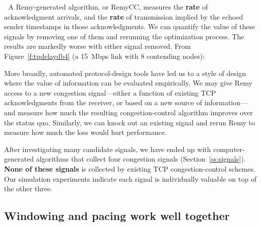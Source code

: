 \vspace{\baselineskip}
\enlargethispage{\baselineskip}

\noindent \begin{minipage}{\textwidth}

\textcolor{white}{.}\hspace{\parindent} A Remy-generated algorithm, or
RemyCC, measures the \textbf{rate} of acknowledgment arrivals, and the
\textbf{rate} of transmission implied by the echoed sender timestamps
in those acknowledgments. We can quantify the value of these signals
by removing one of them and rerunning the optimization process. The
results are markedly worse with either signal removed.  From
Figure~\ref{f:tpdelaydb4} (a 15~Mbps link with 8 contending nodes):

\begin{center}
\def\svgwidth{0.8 \textwidth}\footnotesize
\end{center}
\end{minipage}

More broadly, automated protocol-design tools have led us to a style
of design where the value of information can be evaluated
empirically. We may give Remy access to a new congestion
signal---either a function of existing TCP acknowledgments from the
receiver, or based on a new source of information---and measure
how much the resulting congestion-control algorithm improves over the
status quo. Similarly, we can knock out an existing signal and rerun
Remy to measure how much the loss would hurt performance.

After investigating many candidate signals, we have ended up with
computer-generated algorithms that collect four congestion signals
(Section~\ref{ss:signals}). \textbf{None of these signals} is
collected by existing TCP congestion-control schemes. Our
simulation experiments indicate each signal is individually valuable on
top of the other three.

\subsection{Windowing and pacing work well together}


